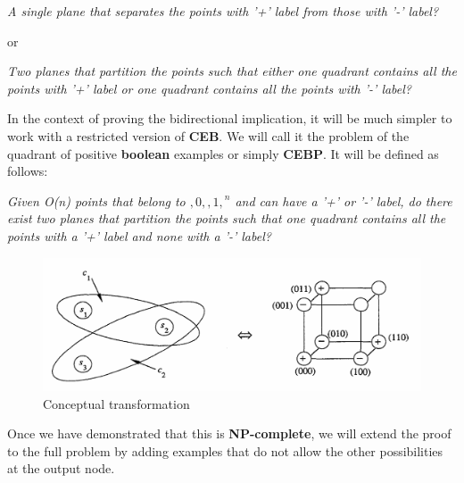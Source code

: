 \documentclass[../main]{subfiles}
\begin{document}
\begin{center}
\textit{A single plane that separates the points with '+' label from those with '-' label?}

or

\textit{Two planes that partition the points such that either one quadrant contains all the points with '+' label or one quadrant contains all the points with '-' label?} \vspace{3mm}
\end{center}

In the context of proving the bidirectional implication, it will be much simpler to work with a restricted version of \textbf{CEB}. We will call it the problem of the quadrant of positive \textbf{boolean} examples or simply \textbf{CEBP}. It will be defined as follows:
\begin{center}
\textit{Given O(n) points that belong to ${, 0, , 1 , }^n$ and can have a '+' or '-' label, do there exist two planes that partition the points such that one quadrant contains all the points with a '+' label and none with a '-' label?}
\end{center}
\begin{figure}[H]
\centering
\includegraphics[width=1\textwidth]{./figures/transformacion}
\caption{Conceptual transformation}
\label{fig:concepto}
\end{figure}
Once we have demonstrated that this is \textbf{NP-complete}, we will extend the proof to the full problem by adding examples that do not allow the other possibilities at the output node.
\end{document}

